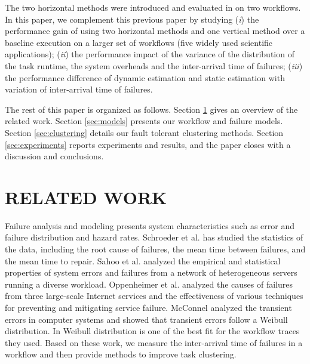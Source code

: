\documentclass{IOS-Book-Article}
\begin{document}
The two horizontal methods were introduced and evaluated in \cite{Chen2012} on two workflows. In this paper, we complement this previous paper by studying (\emph{i}) the performance gain of using two horizontal methods and one vertical method over a baseline execution on a larger set of workflows (five widely used scientific applications); (\emph{ii}) the performance impact of the variance of the distribution of the task runtime, the system overheads and the inter-arrival time of failures; (\emph{iii}) the performance difference of dynamic estimation and static estimation with variation of inter-arrival time of failures.  

The rest of this paper is organized as follows. Section \ref{sec:related} gives an overview of the related work. Section \ref{sec:models} presents our workflow and failure models. Section \ref{sec:clustering} details our fault tolerant clustering methods. Section \ref{sec:experiments} reports experiments and results, and the paper closes with a discussion and conclusions. 



\section{RELATED WORK}
\label{sec:related}

Failure analysis and modeling \cite{Tang1990} presents system characteristics such as error and failure distribution and hazard rates. Schroeder et al. \cite{Schroeder2006} has studied the statistics of the data, including the root cause of failures, the mean time between failures, and the mean time to repair. Sahoo et al. \cite{Sahoo2004} analyzed the empirical and statistical properties of system errors and failures from a network of heterogeneous servers running a diverse workload. Oppenheimer et al. \cite{Oppenheimer2002} analyzed the causes of failures from three large-scale Internet services and the effectiveness of various techniques for preventing and mitigating service failure. McConnel \cite{McConnel} analyzed the transient errors in computer systems and showed that transient errors follow a Weibull distribution. In \cite{Sun2003, Iosup2008} Weibull distribution is one of the best fit for the workflow traces they used.  Based on these work, we measure the inter-arrival time of failures in a workflow and then provide methods to improve task clustering.  
\end{document}
